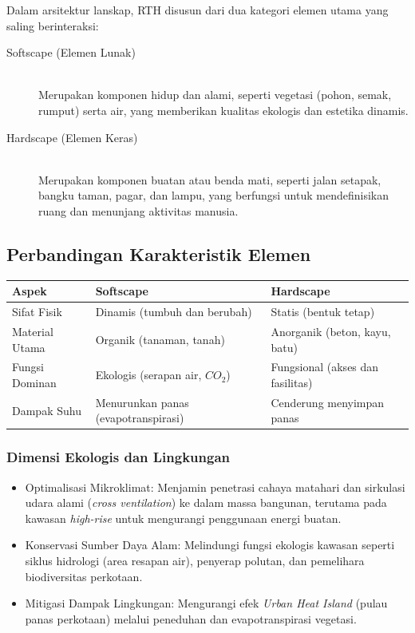\documentclass[../rumukota.tex]{subfiles}
\begin{document}
Dalam arsitektur lanskap, RTH disusun dari dua kategori elemen utama yang saling berinteraksi:

\begin{description}
	\item[Softscape (Elemen Lunak)] \hfill \\ Merupakan komponen hidup dan alami, seperti vegetasi (pohon, semak, rumput) serta air, yang memberikan kualitas ekologis dan estetika dinamis.
	\item[Hardscape (Elemen Keras)] \hfill \\ Merupakan komponen buatan atau benda mati, seperti jalan setapak, bangku taman, pagar, dan lampu, yang berfungsi untuk mendefinisikan ruang dan menunjang aktivitas manusia.
\end{description}

\subsection{Perbandingan Karakteristik Elemen}
\begin{table}[h]
	\centering
	\begin{tabular}{lll}
		\hline
		\textbf{Aspek} & \textbf{Softscape} 🌿                & \textbf{Hardscape} 🧱             \\
		\hline
		Sifat Fisik    & Dinamis (tumbuh dan berubah)        & Statis (bentuk tetap)            \\
		Material Utama & Organik (tanaman, tanah)            & Anorganik (beton, kayu, batu)    \\
		Fungsi Dominan & Ekologis (serapan air, $CO_2$)      & Fungsional (akses dan fasilitas) \\
		Dampak Suhu    & Menurunkan panas (evapotranspirasi) & Cenderung menyimpan panas        \\
		\hline
	\end{tabular}
\end{table}

\subsubsection{Dimensi Ekologis dan Lingkungan}
\begin{itemize}
	\item Optimalisasi Mikroklimat: Menjamin penetrasi cahaya matahari dan sirkulasi udara alami (\textit{cross ventilation}) ke dalam massa bangunan, terutama pada kawasan \textit{high-rise} untuk mengurangi penggunaan energi buatan.
	\item Konservasi Sumber Daya Alam: Melindungi fungsi ekologis kawasan seperti siklus hidrologi (area resapan air), penyerap polutan, dan pemelihara biodiversitas perkotaan.
	\item Mitigasi Dampak Lingkungan: Mengurangi efek \textit{Urban Heat Island} (pulau panas perkotaan) melalui peneduhan dan evapotranspirasi vegetasi.
\end{itemize}
\end{document}
